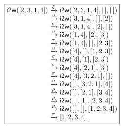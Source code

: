 \documentclass[11pt]{article}
\begin{document}
\TeXtoEPS
\(
\boxed{
\begin{array}{@{}r@{\;}c@{\;}l@{}}
\fun{i2w}([2,3,1,4])
& \xrightarrow{\smash{\xi}} & \fun{i2w}([2,3,1,4],\el,\el)\\
& \xrightarrow{\smash{\upsilon}} & \fun{i2w}([3,1,4],\el,[2])\\
& \xrightarrow{\smash{\sigma}} & \fun{i2w}([3,1,4],[2],\el)\\
& \xrightarrow{\smash{\upsilon}} & \fun{i2w}([1,4],[2],[3])\\
& \xrightarrow{\smash{\tau}} & \fun{i2w}([1,4],\el,[2,3])\\
& \xrightarrow{\smash{\upsilon}} & \fun{i2w}([4],\el,[1,2,3])\\
& \xrightarrow{\smash{\sigma}} & \fun{i2w}([4],[1],[2,3])\\
& \xrightarrow{\smash{\sigma}} & \fun{i2w}([4],[2,1],[3])\\
& \xrightarrow{\smash{\sigma}} & \fun{i2w}([4],[3,2,1],\el)\\
& \xrightarrow{\smash{\upsilon}} & \fun{i2w}(\el,[3,2,1],[4])\\
& \xrightarrow{\smash{\rho}} & \fun{i2w}(\el,[2,1],[3,4])\\
& \xrightarrow{\smash{\rho}} & \fun{i2w}(\el,[1],[2,3,4])\\
& \xrightarrow{\smash{\rho}} & \fun{i2w}(\el,\el,[1,2,3,4])\\
& \xrightarrow{\smash{\pi}} & [1,2,3,4].
\end{array}}
\)
\endTeXtoEPS
\end{document}
